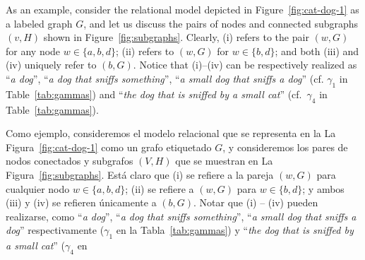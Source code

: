 As an example, consider the relational model depicted in
Figure~\ref{fig:cat-dog-1} as a labeled graph $G$, and let us
discuss the pairs of nodes and connected subgraphs $(v,H)$ shown in
Figure~\ref{fig:subgraphs}. Clearly, (i) refers to the pair $(w,G)$
for any node $w\in\{a,b,d\}$; (ii) refers to $(w,G)$ for
$w\in\{b,d\}$; and both (iii) and (iv) uniquely refer to $(b,G)$. Notice
that (i)--(iv) can be respectively realized as ``{\em a dog}'',
``{\em a dog that sniffs something}'', ``{\em a small dog that
sniffs a dog}'' (cf. $\gamma_1$ in Table~\ref{tab:gammas}) %
and ``{\em the dog that is sniffed by a small cat}'' (cf.~$\gamma_4$ in
Table~\ref{tab:gammas}).


Como ejemplo, consideremos el modelo relacional que se representa en la
La Figura~\ref{fig:cat-dog-1} como un grafo etiquetado $G$, y consideremos los pares de nodos conectados y subgrafos $(V, H)$ que se muestran en 
La Figura~\ref{fig:subgraphs}. Est\'a claro que (i) se refiere a la pareja $(w, G)$
para cualquier nodo $w\in\{a,b,d\}$; (ii) se refiere a $(w, G)$ para
$w\in\{b,d\}$; y ambos (iii) y (iv) se refieren \'unicamente a $(b, G)$. Notar
que (i) -- (iv) pueden realizarse, como  ``{\em a dog}'',
``{\em a dog that sniffs something}'', ``{\em a small dog that
sniffs a dog}'' respectivamente ($\gamma_1$ en la Tabla~\ref{tab:gammas}) y ``{\em the dog that is sniffed by a small cat}'' ($\gamma_4$ en
